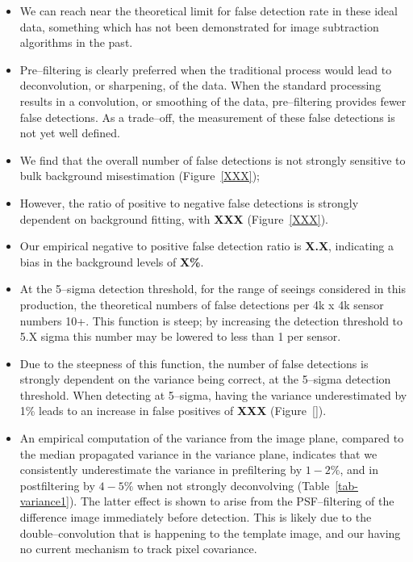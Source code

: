 \documentclass[prd, nofootinbib, floatfix, 11pt,tightenlines,times]{article}
\begin{document}
\begin{itemize}

\item We can reach near the theoretical limit for false detection rate
  in these ideal data, something which has not been demonstrated for
  image subtraction algorithms in the past.

\item Pre--filtering is clearly preferred when the traditional process
  would lead to deconvolution, or sharpening, of the data.  When the
  standard processing results in a convolution, or smoothing of the
  data, pre--filtering provides fewer false detections.  As a
  trade--off, the measurement of these false detections is not yet
  well defined.

\item We find that the overall number of false detections is not
  strongly sensitive to bulk background misestimation
  (Figure~\ref{XXX});

\item However, the ratio of positive to negative false detections is
  strongly dependent on background fitting, with {\bf XXX}
  (Figure~\ref{XXX}).

\item Our empirical negative to positive false detection ratio is {\bf
  X.X}, indicating a bias in the background levels of {\bf X\%}.

\item At the 5--sigma detection threshold, for the range of seeings
  considered in this production, the theoretical numbers of false
  detections per 4k x 4k sensor numbers 10+.  This function is steep;
  by increasing the detection threshold to 5.X sigma this number may
  be lowered to less than 1 per sensor.

\item Due to the steepness of this function, the number of false
  detections is strongly dependent on the variance being correct, at
  the 5--sigma detection threshold.  When detecting at 5--sigma,
  having the variance underestimated by 1\% leads to an increase
  in false positives of {\bf XXX} (Figure~\ref{}).

\item An empirical computation of the variance from the image plane,
  compared to the median propagated variance in the variance plane,
  indicates that we consistently underestimate the variance in
  prefiltering by $1-2\%$, and in postfiltering by $4-5\%$ when not
  strongly deconvolving (Table~\ref{tab-variance1}).  The latter
  effect is shown to arise from the PSF--filtering of the difference
  image immediately before detection.  This is likely due to the
  double--convolution that is happening to the template image, and our
  having no current mechanism to track pixel covariance.


\end{itemize}
\end{document}
